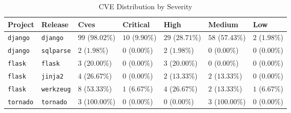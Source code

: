 \begin{table}
\caption{CVE Distribution by Severity}
\label{tab:cve-distribution}
\begin{tabular}{lllllll}
\toprule
Project & Release & Cves & Critical & High & Medium & Low \\
\midrule
\texttt{django} & \texttt{django} & $99$ ($98.02\%$) & $10$ ($9.90\%$) & $29$ ($28.71\%$) & $58$ ($57.43\%$) & $2$ ($1.98\%$) \\
\texttt{django} & \texttt{sqlparse} & $2$ ($1.98\%$) & $0$ ($0.00\%$) & $2$ ($1.98\%$) & $0$ ($0.00\%$) & $0$ ($0.00\%$) \\
\texttt{flask} & \texttt{flask} & $3$ ($20.00\%$) & $0$ ($0.00\%$) & $3$ ($20.00\%$) & $0$ ($0.00\%$) & $0$ ($0.00\%$) \\
\texttt{flask} & \texttt{jinja2} & $4$ ($26.67\%$) & $0$ ($0.00\%$) & $2$ ($13.33\%$) & $2$ ($13.33\%$) & $0$ ($0.00\%$) \\
\texttt{flask} & \texttt{werkzeug} & $8$ ($53.33\%$) & $1$ ($6.67\%$) & $4$ ($26.67\%$) & $2$ ($13.33\%$) & $1$ ($6.67\%$) \\
\texttt{tornado} & \texttt{tornado} & $3$ ($100.00\%$) & $0$ ($0.00\%$) & $0$ ($0.00\%$) & $3$ ($100.00\%$) & $0$ ($0.00\%$) \\
\bottomrule
\end{tabular}
\end{table}
